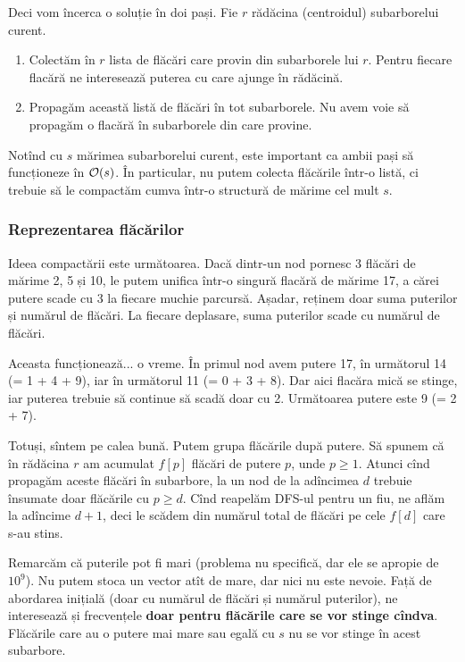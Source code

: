 \documentclass[../main.tex]{subfiles}
\begin{document}
Deci vom încerca o soluție în doi pași. Fie $r$ rădăcina (centroidul) subarborelui curent.

\begin{enumerate}
  \item Colectăm în $r$ lista de flăcări care provin din subarborele lui $r$. Pentru fiecare flacără ne interesează puterea cu care ajunge în rădăcină.

  \item Propagăm această listă de flăcări în tot subarborele. Nu avem voie să propagăm o flacără în subarborele din care provine.
\end{enumerate}

Notînd cu $s$ mărimea subarborelui curent, este important ca ambii pași să funcționeze în $\mathcal{O}(s)$. În particular, nu putem colecta flăcările într-o listă, ci trebuie să le compactăm cumva într-o structură de mărime cel mult $s$.

\subsubsection*{Reprezentarea flăcărilor}

Ideea compactării este următoarea. Dacă dintr-un nod pornesc 3 flăcări de mărime 2, 5 și 10, le putem unifica într-o singură flacără de mărime 17, a cărei putere scade cu 3 la fiecare muchie parcursă. Așadar, reținem doar suma puterilor și numărul de flăcări. La fiecare deplasare, suma puterilor scade cu numărul de flăcări.

Aceasta funcționează... o vreme. În primul nod avem putere 17, în următorul 14 (= 1 + 4 + 9), iar în următorul 11 (= 0 + 3 + 8). Dar aici flacăra mică se stinge, iar puterea trebuie să continue să scadă doar cu 2. Următoarea putere este 9 (= 2 + 7).

Totuși, sîntem pe calea bună. Putem grupa flăcările după putere. Să spunem că în rădăcina $r$ am acumulat $f[p]$ flăcări de putere $p$, unde $p \geq 1$. Atunci cînd propagăm aceste flăcări în subarbore, la un nod de la adîncimea $d$ trebuie însumate doar flăcările cu $p \geq d$. Cînd reapelăm DFS-ul pentru un fiu, ne aflăm la adîncime $d+1$, deci le scădem din numărul total de flăcări pe cele $f[d]$ care s-au stins.

Remarcăm că puterile pot fi mari (problema nu specifică, dar ele se apropie de $10^9$). Nu putem stoca un vector atît de mare, dar nici nu este nevoie. Față de abordarea inițială (doar cu numărul de flăcări și numărul puterilor), ne interesează și frecvențele \textbf{doar pentru flăcările care se vor stinge cîndva}. Flăcările care au o putere mai mare sau egală cu $s$ nu se vor stinge în acest subarbore.
\end{document}
